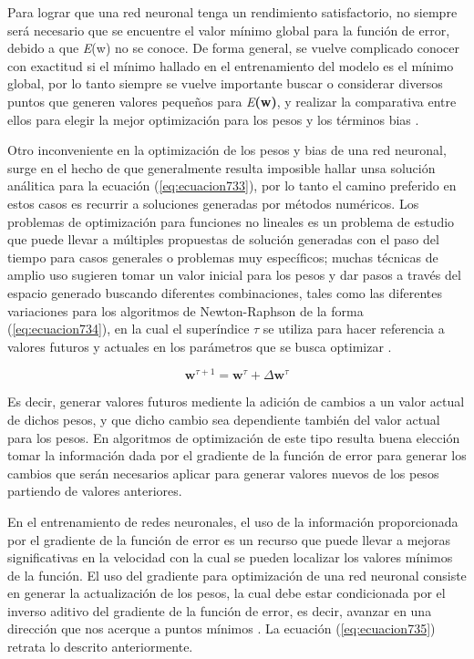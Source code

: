{Para lograr que una red neuronal tenga un rendimiento satisfactorio, no siempre será necesario que se encuentre el valor mínimo global para la función de error, debido a que \textit{E}(w) no se conoce. De forma general, se vuelve complicado conocer con exactitud 
si el mínimo hallado en el entrenamiento del modelo es el mínimo global, por lo tanto siempre se vuelve importante buscar o considerar diversos puntos que generen valores pequeños para \textit{E}\textbf{(w)}, y realizar 
la comparativa entre ellos para elegir la mejor optimización para los pesos y los términos bias \cite{bishop}.

Otro inconveniente en la optimización de los pesos y bias de una red neuronal, surge en el hecho de que generalmente resulta imposible hallar unsa solución análitica para la ecuación (\ref{eq:ecuacion733}), por lo tanto 
el camino preferido en estos casos es recurrir a soluciones generadas por métodos numéricos. Los problemas de optimización para funciones no lineales es un problema de estudio que puede llevar a múltiples propuestas de solución
generadas con el paso del tiempo para casos generales o problemas muy específicos; muchas técnicas de amplio uso sugieren tomar un valor inicial para los pesos y dar pasos a través del espacio generado buscando diferentes 
combinaciones, tales como las diferentes variaciones para los algoritmos de Newton-Raphson de la forma (\ref{eq:ecuacion734}), en la cual el superíndice $\tau$ se utiliza para hacer referencia a valores futuros y actuales en los parámetros que se busca optimizar \cite{bishop}.

\begin{equation}
	\textbf{w}^{\tau + 1}=\textbf{w}^{\tau} + \Delta \textbf{w}^{\tau}  
	\label{eq:ecuacion734}
\end{equation}

Es decir, generar valores futuros mediente la adición de cambios a un valor actual de dichos pesos, y que dicho cambio sea dependiente también del valor actual para los pesos. En algoritmos de optimización de este tipo
resulta buena elección tomar la información dada por el gradiente de la función de error para generar los cambios que serán necesarios aplicar para generar valores nuevos de los pesos partiendo de valores anteriores.

En el entrenamiento de redes neuronales, el uso de la información proporcionada por el gradiente de la función de error es un recurso que puede llevar a mejoras significativas en la velocidad con la cual se pueden localizar 
los valores mínimos de la función. El uso del gradiente para optimización de una red neuronal consiste en generar la actualización de los pesos, la cual debe estar condicionada por el inverso aditivo del gradiente de la función 
de error, es decir, avanzar en una dirección que nos acerque a puntos mínimos \cite{bishop}. La ecuación (\ref{eq:ecuacion735}) retrata lo descrito anteriormente.

}

